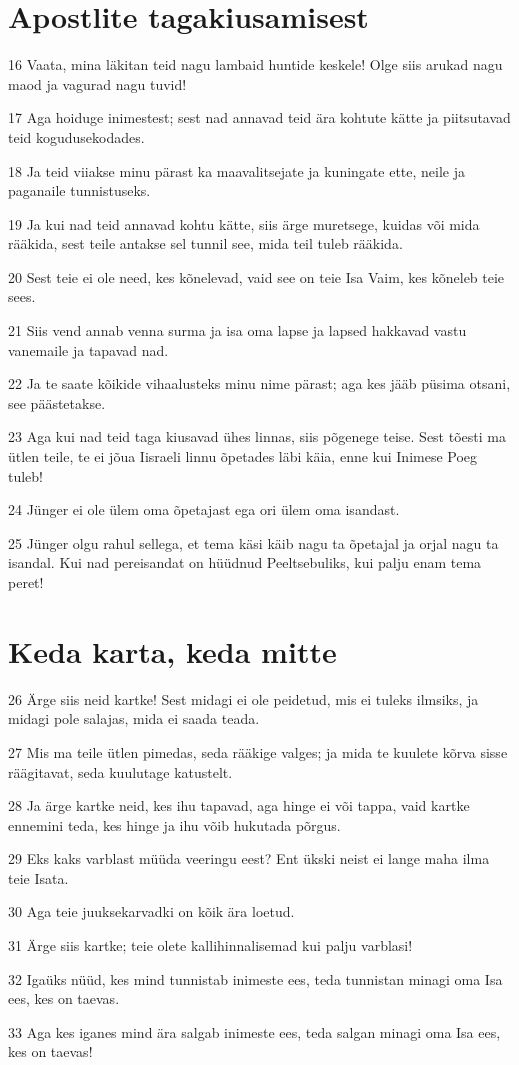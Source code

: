 \section*{Apostlite tagakiusamisest}

\par 16 Vaata, mina läkitan teid nagu lambaid huntide keskele! Olge siis arukad nagu maod ja vagurad nagu tuvid!
\par 17 Aga hoiduge inimestest; sest nad annavad teid ära kohtute kätte ja piitsutavad teid kogudusekodades.
\par 18 Ja teid viiakse minu pärast ka maavalitsejate ja kuningate ette, neile ja paganaile tunnistuseks.
\par 19 Ja kui nad teid annavad kohtu kätte, siis ärge muretsege, kuidas või mida rääkida, sest teile antakse sel tunnil see, mida teil tuleb rääkida.
\par 20 Sest teie ei ole need, kes kõnelevad, vaid see on teie Isa Vaim, kes kõneleb teie sees.
\par 21 Siis vend annab venna surma ja isa oma lapse ja lapsed hakkavad vastu vanemaile ja tapavad nad.
\par 22 Ja te saate kõikide vihaalusteks minu nime pärast; aga kes jääb püsima otsani, see päästetakse.
\par 23 Aga kui nad teid taga kiusavad ühes linnas, siis põgenege teise. Sest tõesti ma ütlen teile, te ei jõua Iisraeli linnu õpetades läbi käia, enne kui Inimese Poeg tuleb!
\par 24 Jünger ei ole ülem oma õpetajast ega ori ülem oma isandast.
\par 25 Jünger olgu rahul sellega, et tema käsi käib nagu ta õpetajal ja orjal nagu ta isandal. Kui nad pereisandat on hüüdnud Peeltsebuliks, kui palju enam tema peret!

\section*{Keda karta, keda mitte}

\par 26 Ärge siis neid kartke! Sest midagi ei ole peidetud, mis ei tuleks ilmsiks, ja midagi pole salajas, mida ei saada teada.
\par 27 Mis ma teile ütlen pimedas, seda rääkige valges; ja mida te kuulete kõrva sisse räägitavat, seda kuulutage katustelt.
\par 28 Ja ärge kartke neid, kes ihu tapavad, aga hinge ei või tappa, vaid kartke ennemini teda, kes hinge ja ihu võib hukutada põrgus.
\par 29 Eks kaks varblast müüda veeringu eest? Ent ükski neist ei lange maha ilma teie Isata.
\par 30 Aga teie juuksekarvadki on kõik ära loetud.
\par 31 Ärge siis kartke; teie olete kallihinnalisemad kui palju varblasi!
\par 32 Igaüks nüüd, kes mind tunnistab inimeste ees, teda tunnistan minagi oma Isa ees, kes on taevas.
\par 33 Aga kes iganes mind ära salgab inimeste ees, teda salgan minagi oma Isa ees, kes on taevas!

